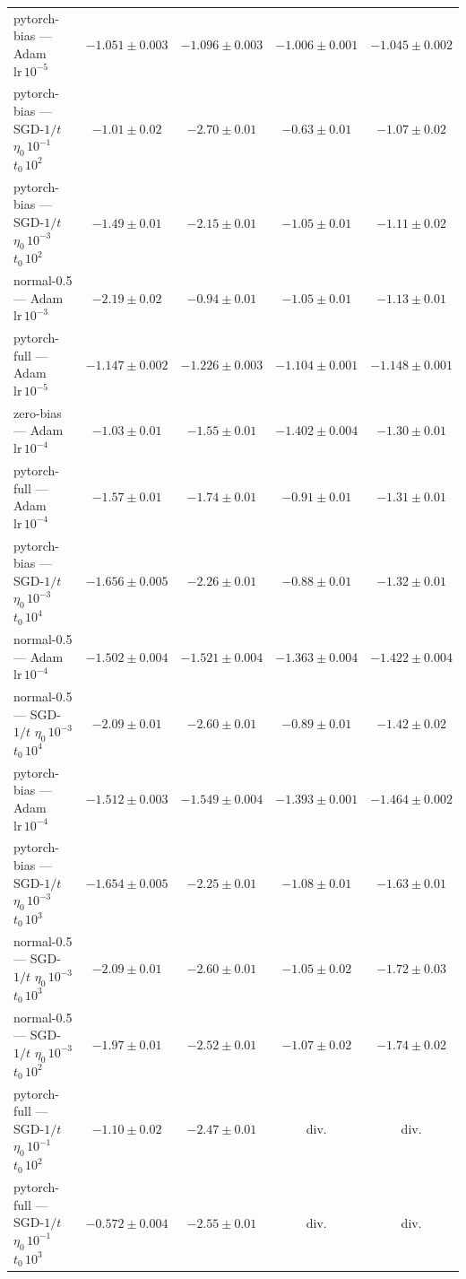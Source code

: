 \begin{table}[H]
\begin{tabular}{@{}>{\raggedright\arraybackslash}p{5.2cm} cccc@{}}
pytorch-bias --- Adam $\mathrm{lr}\,10^{-5}$ & $-1.051 \pm 0.003$ & $-1.096 \pm 0.003$ & $-1.006 \pm 0.001$ & $-1.045 \pm 0.002$ \\
pytorch-bias --- SGD-$1/t$ $\eta_0\,10^{-1}$ $t_0\,10^{2}$ & $-1.01 \pm 0.02$ & $-2.70 \pm 0.01$ & $-0.63 \pm 0.01$ & $-1.07 \pm 0.02$ \\
pytorch-bias --- SGD-$1/t$ $\eta_0\,10^{-3}$ $t_0\,10^{2}$ & $-1.49 \pm 0.01$ & $-2.15 \pm 0.01$ & $-1.05 \pm 0.01$ & $-1.11 \pm 0.02$ \\
normal-0.5 --- Adam $\mathrm{lr}\,10^{-3}$ & $-2.19 \pm 0.02$ & $-0.94 \pm 0.01$ & $-1.05 \pm 0.01$ & $-1.13 \pm 0.01$ \\
pytorch-full --- Adam $\mathrm{lr}\,10^{-5}$ & $-1.147 \pm 0.002$ & $-1.226 \pm 0.003$ & $-1.104 \pm 0.001$ & $-1.148 \pm 0.001$ \\
zero-bias --- Adam $\mathrm{lr}\,10^{-4}$ & $-1.03 \pm 0.01$ & $-1.55 \pm 0.01$ & $-1.402 \pm 0.004$ & $-1.30 \pm 0.01$ \\
pytorch-full --- Adam $\mathrm{lr}\,10^{-4}$ & $-1.57 \pm 0.01$ & $-1.74 \pm 0.01$ & $-0.91 \pm 0.01$ & $-1.31 \pm 0.01$ \\
pytorch-bias --- SGD-$1/t$ $\eta_0\,10^{-3}$ $t_0\,10^{4}$ & $-1.656 \pm 0.005$ & $-2.26 \pm 0.01$ & $-0.88 \pm 0.01$ & $-1.32 \pm 0.01$ \\
normal-0.5 --- Adam $\mathrm{lr}\,10^{-4}$ & $-1.502 \pm 0.004$ & $-1.521 \pm 0.004$ & $-1.363 \pm 0.004$ & $-1.422 \pm 0.004$ \\
normal-0.5 --- SGD-$1/t$ $\eta_0\,10^{-3}$ $t_0\,10^{4}$ & $-2.09 \pm 0.01$ & $-2.60 \pm 0.01$ & $-0.89 \pm 0.01$ & $-1.42 \pm 0.02$ \\
pytorch-bias --- Adam $\mathrm{lr}\,10^{-4}$ & $-1.512 \pm 0.003$ & $-1.549 \pm 0.004$ & $-1.393 \pm 0.001$ & $-1.464 \pm 0.002$ \\
pytorch-bias --- SGD-$1/t$ $\eta_0\,10^{-3}$ $t_0\,10^{3}$ & $-1.654 \pm 0.005$ & $-2.25 \pm 0.01$ & $-1.08 \pm 0.01$ & $-1.63 \pm 0.01$ \\
normal-0.5 --- SGD-$1/t$ $\eta_0\,10^{-3}$ $t_0\,10^{3}$ & $-2.09 \pm 0.01$ & $-2.60 \pm 0.01$ & $-1.05 \pm 0.02$ & $-1.72 \pm 0.03$ \\
normal-0.5 --- SGD-$1/t$ $\eta_0\,10^{-3}$ $t_0\,10^{2}$ & $-1.97 \pm 0.01$ & $-2.52 \pm 0.01$ & $-1.07 \pm 0.02$ & $-1.74 \pm 0.02$ \\
pytorch-full --- SGD-$1/t$ $\eta_0\,10^{-1}$ $t_0\,10^{2}$ & $-1.10 \pm 0.02$ & $-2.47 \pm 0.01$ & div. & div. \\
pytorch-full --- SGD-$1/t$ $\eta_0\,10^{-1}$ $t_0\,10^{3}$ & $-0.572 \pm 0.004$ & $-2.55 \pm 0.01$ & div. & div. \\

\end{tabular}
\end{table}
